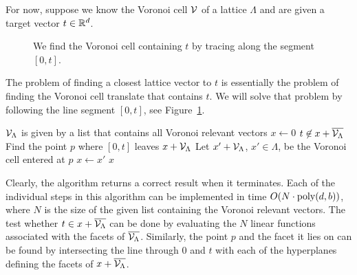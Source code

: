 For now, suppose we know the Voronoi cell $\mathcal{V}$ of a lattice $\Lambda$
and are given a target vector $t \in \mathbb{R}^d$.
\begin{figure}
\begin{center}
\end{center}
\caption{We find the Voronoi cell containing $t$ by tracing along the segment $[0,t]$.}
\label{fig:cvp-via-voronoi-cell-tracing}
\end{figure}
The problem of finding a closest lattice vector to $t$
is essentially the problem of finding the Voronoi cell translate that contains $t$.
We will solve that problem by following the line segment $[0,t]$,
see Figure~\ref{fig:cvp-via-voronoi-cell-tracing}.
\begin{codebox}
  \zi $\mathcal{V}_\Lambda$ is given by a list that contains all Voronoi relevant vectors
  \li $x \gets 0$
  \li \While $t \not\in x + \overline{\mathcal{V}_\Lambda}$
  \li \Do Find the point $p$ where $[0,t]$ leaves $x + \mathcal{V}_\Lambda$
  \li     Let $x' + \mathcal{V}_\Lambda$, $x' \in \Lambda$, be the Voronoi cell entered at $p$
  \li     $x \gets x'$
      \End
  \li \Return $x$
\end{codebox}
Clearly, the algorithm returns a correct result when it terminates.
Each of the individual steps in this algorithm can be implemented in time $O(N \cdot \operatorname{poly}(d,b))$,
where $N$ is the size of the given list containing the Voronoi relevant vectors.
The test whether $t \in x + \overline{\mathcal{V}_\Lambda}$ can be done by evaluating the $N$ linear functions
associated with the facets of $\overline{\mathcal{V}_\Lambda}$.
Similarly, the point $p$ and the facet it lies on can be found by intersecting the line through $0$ and $t$
with each of the hyperplanes defining the facets of $x + \overline{\mathcal{V}_\Lambda}$.


